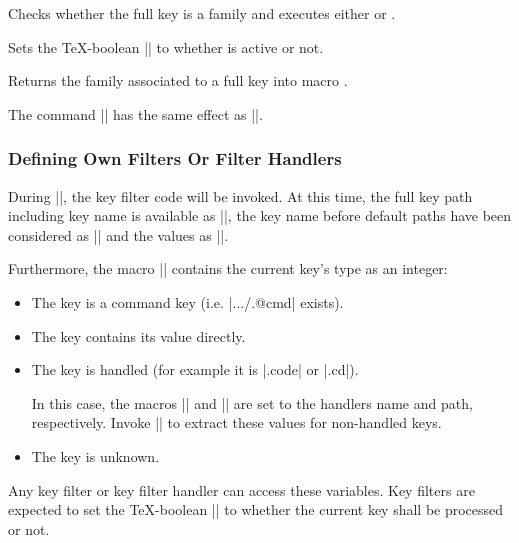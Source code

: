 \begin{command}{\pgfkeysiffamilydefined{}}%
    Checks whether the full key  is a family and executes either
     or .
\end{command}

\begin{command}{\pgfkeysisfamilyactive{}}%
    Sets the \TeX-boolean |\ifpgfkeysfiltercontinue| to whether 
    is active or not.
\end{command}

\begin{command}{\pgfkeysgetfamily{}}%
    Returns the family associated to a full key  into macro
    .
\end{command}

\begin{command}{\pgfkeyssetfamily{}}%
    The command |\pgfkeyssetfamily| has the same
    effect as ||.
\end{command}


\subsubsection{Defining Own Filters Or Filter Handlers}
\label{section-key-writing-filters}

During |\pgfkeysfiltered|, the key filter code will be invoked. At this time,
the full key path including key name is available as |\pgfkeyscurrentkey|, the
key name before default paths have been considered as |\pgfkeyscurrentkeyRAW|
and the values as |\pgfkeyscurrentvalue|.

Furthermore, the macro |\pgfkeyscasenumber| contains the current key's type as
an integer:
%
\begin{itemize}
    \item[\meta{1}] The key is a command key (i.e. |.../.@cmd| exists).
    \item[\meta{2}] The key contains its value directly.
    \item[\meta{3}] The key is handled (for example it is |.code| or |.cd|).

        In this case, the macros |\pgfkeyscurrentname| and
        |\pgfkeyscurrentpath| are set to the handlers name and path,
        respectively. Invoke |\pgfkeyssplitpath{}| to extract these values for
        non-handled keys.
    \item[\meta{0}] The key is unknown.
\end{itemize}
%
Any key filter or key filter handler can access these variables. Key filters
are expected to set the \TeX-boolean |\ifpgfkeysfiltercontinue| to whether the
current key shall be processed or not.

